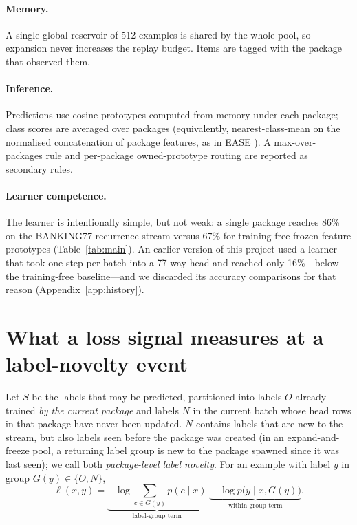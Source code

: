 \documentclass[10pt]{article}
\begin{document}
\paragraph{Memory.} A single global reservoir \citep{vitter1985reservoir} of 512 examples is shared by the whole pool, so expansion never increases the replay budget. Items are tagged with the package that observed them.

\paragraph{Inference.} Predictions use cosine prototypes computed from memory under each package; class scores are averaged over packages (equivalently, nearest-class-mean on the normalised concatenation of package features, as in EASE \citep{zhou2024ease}). A max-over-packages rule and per-package owned-prototype routing are reported as secondary rules.

\paragraph{Learner competence.} The learner is intentionally simple, but not weak: a single package reaches 86\% on the BANKING77 recurrence stream versus 67\% for training-free frozen-feature prototypes (Table~\ref{tab:main}). An earlier version of this project used a learner that took one step per batch into a 77-way head and reached only 16\%---below the training-free baseline---and we discarded its accuracy comparisons for that reason (Appendix~\ref{app:history}).

\section{What a loss signal measures at a label-novelty event}
\label{sec:mechanism}

Let $S$ be the labels that may be predicted, partitioned into labels $O$ already trained \emph{by the current package} and labels $N$ in the current batch whose head rows in that package have never been updated. $N$ contains labels that are new to the stream, but also labels seen before the package was created (in an expand-and-freeze pool, a returning label group is new to the package spawned since it was last seen); we call both \emph{package-level label novelty}. For an example with label $y$ in group $G(y)\in\{O,N\}$,
\begin{equation}
\ell(x,y) = \underbrace{-\log \textstyle\sum_{c\in G(y)} p(c\mid x)}_{\text{label-group term}}\;\underbrace{-\;\log p\big(y \mid x, G(y)\big)}_{\text{within-group term}} .
\label{eq:decomp}
\end{equation}
\end{document}
